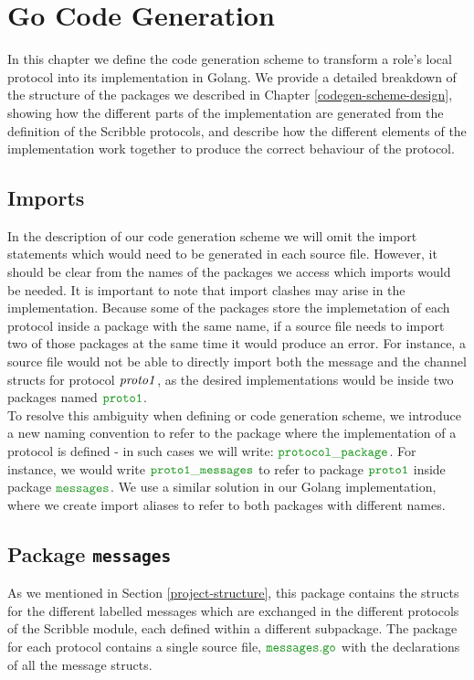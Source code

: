 \documentclass[12pt,twoside]{report}
\begin{document}
\chapter{Go Code Generation}\label{go-codegen}
In this chapter we define the code generation scheme to transform a role's local protocol into its implementation in Golang. We provide a detailed breakdown of the structure of the packages we described in Chapter \ref{codegen-scheme-design}, showing how the different parts of the implementation are generated from the definition of the Scribble protocols, and describe how the different elements of the implementation work together to produce the correct behaviour of the protocol.

\section{Imports}
In the description of our code generation scheme we will omit the import statements which would need to be generated in each source file. However, it should be clear from the names of the packages we access which imports would be needed. It is important to note that import clashes may arise in the implementation. Because some of the packages store the implemetation of each protocol inside a package with the same name, if a source file needs to import two of those packages at the same time it would produce an error. For instance, a source file would not be able to directly import both the message and the channel structs for protocol ${\mathit{proto1}}$, as the desired implementations would be inside two packages named $\pkgname{proto1}$.\\

To resolve this ambiguity when defining or code generation scheme, we introduce a new naming convention to refer to the package where the implementation of a protocol is defined - in such cases we will write: $\pkgname{protocol\_package}$. For instance, we would write $\pkgname{proto1\_messages}$ to refer to package $\pkgname{proto1}$ inside package $\pkgname{messages}$. We use a similar solution in our Golang implementation, where we create import aliases to refer to both packages with different names.\\


\section{Package \texttt{messages}}
As we mentioned in Section \ref{project-structure}, 
this package contains the structs for the different labelled messages which are exchanged in the different protocols of the Scribble module, each defined within a different subpackage. The package for each protocol contains a single source file, $\filename{messages}$ with the declarations of all the message structs.\\
\end{document}
